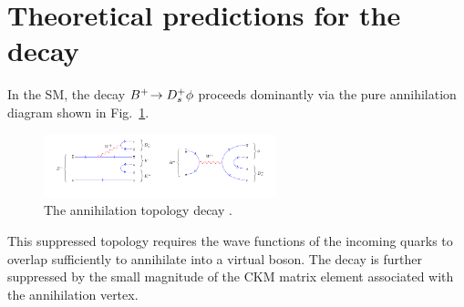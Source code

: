 
\section{Theoretical predictions for the \decay{\Bp}{\Dsp\phiz} decay}
\label{sec:theory_B2DsPhi}

In the SM, the decay ${{{B}^+}}\!\rightarrow {\ensuremath{{D}^+_{s}}}\phi$ proceeds dominantly via the pure annihilation diagram shown in Fig.~\ref{fig:Theory_DsPhiDiagram}. 
\begin{figure}[!h]
    \centering
    \includegraphics[width=0.6\textwidth]{figs/Theory/B2DsPhi.pdf}
    \caption{The annihilation topology decay \decay{\Bp}{\Dsp\phiz}. }
    \label{fig:Theory_DsPhiDiagram}   
\end{figure}
This suppressed topology requires the wave functions of the incoming quarks to overlap sufficiently to annihilate into a virtual \Wp boson. The decay is further suppressed by the small magnitude of the CKM matrix element \Vub associated with the annihilation vertex. 

